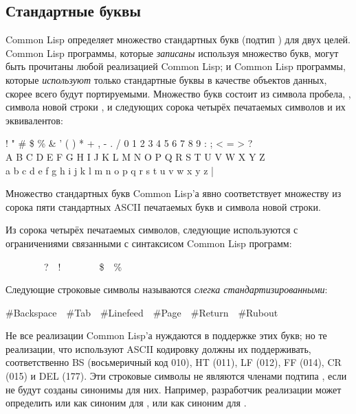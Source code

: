 \subsection{Стандартные буквы}

Common Lisp определяет множество стандартных букв (подтип
) для двух целей.  Common Lisp программы, которые
\emph{записаны} используя множество букв, могут быть прочитаны любой
реализацией Common Lisp; и Common Lisp программы, которые
\emph{используют} только стандартные буквы в качестве объектов данных,
скорее всего будут портируемыми. 
Множество букв состоит из символа
пробела, , символа новой строки
, и следующих сорока четырёх печатаемых
символов и их эквивалентов:
\begin{lisp}
! " \# \$ \% \& ' ( ) * + , - . / 0 1 2 3 4 5 6 7 8 9 : ; < = > ? \\
{\Xatsign} A B C D E F G H I J K L M N O P Q R S T U V W X Y Z {\Xlbracket} {\Xbackslash} {\Xrbracket} {\Xcircumflex} {\Xunderscore} \\
{\Xbq} a b c d e f g h i j k l m n o p q r s t u v w x y z {\Xlbrace} | {\Xrbrace} {\Xtilde}
\end{lisp}

Множество стандартных букв Common Lisp'а явно соответствует
множеству из сорока пяти стандартных ASCII печатаемых букв и символа новой
строки.

Из сорока четырёх печатаемых символов, следующие используются с ограничениями
связанными с синтаксисом Common Lisp программ:
\begin{lisp}
{\Xlbracket}~~{\Xrbracket}~~{\Xlbrace}~~{\Xrbrace}~~?~~!~~{\Xcircumflex}~~{\Xunderscore}~~{\Xtilde}~~\$~~\% 
\end{lisp}

Следующие строковые символы называются \emph{слегка стандартизированными}:
\begin{lisp}
\#{\Xbackslash}Backspace~~\#{\Xbackslash}Tab~~\#{\Xbackslash}Linefeed~~\#{\Xbackslash}Page~~\#{\Xbackslash}Return~~\#{\Xbackslash}Rubout
\end{lisp}

Не все реализации Common Lisp'а нуждаются в поддержке этих букв; но те
реализации, что используют ASCII кодировку должны их поддерживать,
соответственно BS (восьмеричный код 010), HT (011), LF (012), FF (014), CR
(015) и DEL (177). Эти строковые символы не являются членами подтипа
, если не будут созданы синонимы для них.
Например, разработчик реализации может 
определить  или  как
синоним для ,
или  как синоним для .

